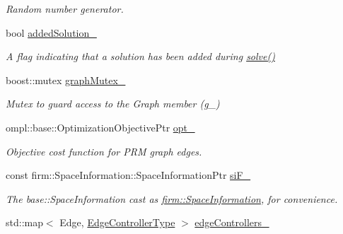 \begin{DoxyCompactItemize}
\begin{DoxyCompactList}\small\item\em \-Random number generator. \end{DoxyCompactList}\item 
\hypertarget{class_f_i_r_m_afc413ddef9b66cd337c0e19c6ba79d84}{bool \hyperlink{class_f_i_r_m_afc413ddef9b66cd337c0e19c6ba79d84}{added\-Solution\-\_\-}}\label{class_f_i_r_m_afc413ddef9b66cd337c0e19c6ba79d84}

\begin{DoxyCompactList}\small\item\em \-A flag indicating that a solution has been added during \hyperlink{class_f_i_r_m_a02f3c98de4840594193ba5bf7ff3ca63}{solve()} \end{DoxyCompactList}\item 
\hypertarget{class_f_i_r_m_ae71c316b447bb7b404dc27c8d673fd55}{boost\-::mutex \hyperlink{class_f_i_r_m_ae71c316b447bb7b404dc27c8d673fd55}{graph\-Mutex\-\_\-}}\label{class_f_i_r_m_ae71c316b447bb7b404dc27c8d673fd55}

\begin{DoxyCompactList}\small\item\em \-Mutex to guard access to the \-Graph member (g\-\_\-) \end{DoxyCompactList}\item 
\hypertarget{class_f_i_r_m_aac6a297cb2f700d31396b8cd5a88e81b}{ompl\-::base\-::\-Optimization\-Objective\-Ptr \hyperlink{class_f_i_r_m_aac6a297cb2f700d31396b8cd5a88e81b}{opt\-\_\-}}\label{class_f_i_r_m_aac6a297cb2f700d31396b8cd5a88e81b}

\begin{DoxyCompactList}\small\item\em \-Objective cost function for \-P\-R\-M graph edges. \end{DoxyCompactList}\item 
\hypertarget{class_f_i_r_m_afd4f91dc510bf7b5b68b4da5cfd90718}{const \*
firm\-::\-Space\-Information\-::\-Space\-Information\-Ptr \hyperlink{class_f_i_r_m_afd4f91dc510bf7b5b68b4da5cfd90718}{si\-F\-\_\-}}\label{class_f_i_r_m_afd4f91dc510bf7b5b68b4da5cfd90718}

\begin{DoxyCompactList}\small\item\em \-The base\-::\-Space\-Information cast as \hyperlink{classfirm_1_1_space_information}{firm\-::\-Space\-Information}, for convenience. \end{DoxyCompactList}\item 
\hypertarget{class_f_i_r_m_abfacc68b478054d0b99a3965d33d718a}{std\-::map$<$ \-Edge, \*
\hyperlink{class_f_i_r_m_a70abcb24fbc9f836b94119f65c8f8a37}{\-Edge\-Controller\-Type} $>$ \hyperlink{class_f_i_r_m_abfacc68b478054d0b99a3965d33d718a}{edge\-Controllers\-\_\-}}\label{class_f_i_r_m_abfacc68b478054d0b99a3965d33d718a}


\end{DoxyCompactItemize}
